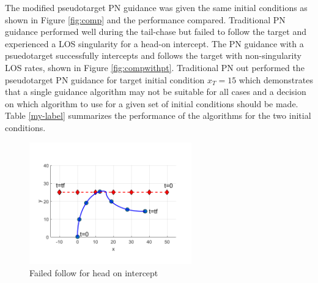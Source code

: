 \documentclass[conference]{IEEEtran}
\begin{document}
The modified pseudotarget PN guidance was given the same initial conditions as shown in Figure \ref{fig:comp} and the performance compared. Traditional PN guidance performed well during the tail-chase but failed to follow the target and experienced a LOS singularity for a head-on intercept. The PN guidance with a psuedotarget successfully intercepts and follows the target with non-singularity LOS rates, shown in Figure \ref{fig:compwithpt}. Traditional PN out performed the pseudotarget PN guidance for target initial condition $x_{T} = 15$ which demonstrates that a single guidance algorithm may not be suitable for all cases and a decision on which algorithm to use for a given set of initial conditions should be made. Table \ref{my-label} summarizes the performance of the algorithms for the two initial conditions.



\begin{figure}[H]
	\centering
	\includegraphics[width=7cm] {x50}
	\caption{Failed follow for head on intercept}
	\label{fig:failedIntercept}
	\hspace*{0mm}
\end{figure}
\end{document}
